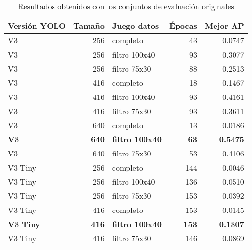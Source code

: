 \begin{table}[H]
	\centering
	\begin{tabular}{lrlrr}
		\toprule
		Versión YOLO &  Tamaño &    Juego datos &  Épocas &  Mejor AP \\
		\midrule
		V3      &     256 &       completo &      43 &    0.0747 \\
		V3      &     256 &  filtro 100x40 &      93 &    0.3077 \\
		V3      &     256 &   filtro 75x30 &      88 &    0.2513 \\
		V3      &     416 &       completo &      18 &    0.1467 \\
		V3      &     416 &  filtro 100x40 &      93 &    0.4161 \\
		V3      &     416 &   filtro 75x30 &      93 &    0.3611 \\
		V3      &     640 &       completo &      13 &    0.0186 \\
		\textbf{V3}      &     \textbf{640} &  \textbf{filtro 100x40} &      \textbf{63} &    \textbf{0.5475} \\
		V3      &     640 &   filtro 75x30 &      53 &    0.4106 \\
		V3 Tiny &     256 &       completo &     144 &    0.0046 \\
		V3 Tiny &     256 &  filtro 100x40 &     136 &    0.0510 \\
		V3 Tiny &     256 &   filtro 75x30 &     153 &    0.0392 \\
		V3 Tiny &     416 &       completo &     153 &    0.0145 \\
		\textbf{V3 Tiny} &     \textbf{416} &  \textbf{filtro 100x40} &     \textbf{153} &    \textbf{0.1307} \\
		V3 Tiny &     416 &   filtro 75x30 &     146 &    0.0869 \\
		\bottomrule
	\end{tabular}
	\caption{Resultados obtenidos con los conjuntos de evaluación originales}
	\label{tab:evaluationoriginal}
\end{table}

